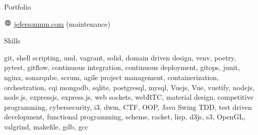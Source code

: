 \documentclass{cv} %
\def\iconsize{0.4cm}
\begin{document}
\begin{minipage}[b][0.9\paperheight][t]{0.29\linewidth}
\begin{rSection}{Portfolio}
    \item[]\includegraphics[width=\iconsize, trim={0cm 0.12cm 0.03cm 0cm}]{website.png}
        \href{http://jefersonmm.com}{jefersonmm.com} (maintenance)
\end{rSection}

\begin{rSection}{Skills}
    \item[] git, shell scripting, uml, vagrant, solid, domain driven design,
    venv, poetry, pytest, gitflow, continuous integration, continuous deployment,
    gitops, junit, nginx, sonarqube, scrum, agile project management, containerization,
    orchestration, cqi
    mongodb, sqlite, postgresql, mysql, %
    Vuejs, Vue, vuetify, nodejs, node.js, expressjs, express.js, web sockets, webRTC, material design, %
    competitive programming, cybersecurity, i3, dwm, CTF, OOP, Java Swing TDD, test driven development,
    functional programming, scheme, racket, lisp, d3js, s3, OpenGL, valgrind, makefile, gdb, gcc
\end{rSection}

\end{minipage}
\hspace{0.1cm}
\end{document}
